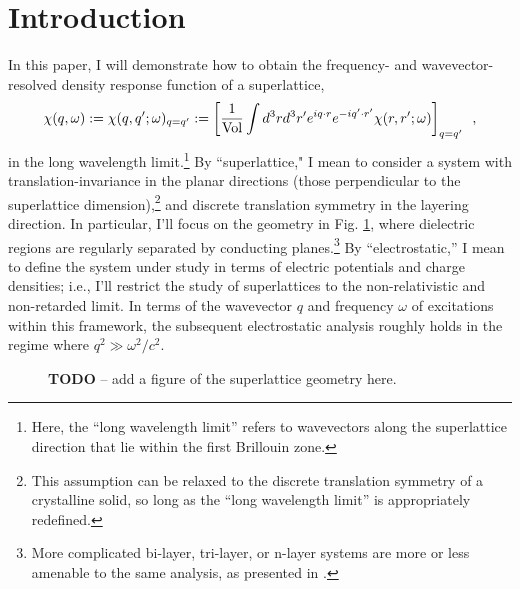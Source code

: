 \section*{Introduction}

In this paper, I will demonstrate how to obtain the frequency- and wavevector-resolved density response function of a superlattice,
\begin{equation}
    \label{Fourier chi}
    \chi(q,\omega):=\chi(q,q';\omega)_{q=q'}
    :=
    \left[\frac{1}{\text{Vol}}\int d^3 r d^3 r' e^{iq\cdot r} e^{-i q'\cdot r'}\chi(r,r';\omega)\right]_{q=q'}
    \,\,\,,
\end{equation}
in the long wavelength limit.\footnote{Here, the ``long wavelength limit'' refers to wavevectors along the superlattice direction that lie within the first Brillouin zone.}  By ``superlattice," I mean to consider a system with translation-invariance in the planar directions (those perpendicular to the superlattice dimension),\footnote{This assumption can be relaxed to the discrete translation symmetry of a crystalline solid, so long as the ``long wavelength limit'' is appropriately redefined.} and discrete translation symmetry in the layering direction.  In particular, I'll focus on the geometry in Fig. \ref{figure: superlattice geometry}, where dielectric regions are regularly separated by conducting planes.\footnote{More complicated bi-layer, tri-layer, or n-layer systems are more or less amenable to the same analysis, as presented in \cite{Cottam1993, Cottam2004}.}  By ``electrostatic,'' I mean to define the system under study in terms of electric potentials and charge densities; i.e., I'll restrict the study of superlattices to the non-relativistic and non-retarded limit.  In terms of the wavevector $q$ and frequency $\omega$ of excitations within this framework, the subsequent electrostatic analysis roughly holds in the regime where $q^2\gg \omega^2/c^2$.

\begin{figure}
    \centering
    \caption{
    {\bf TODO} -- add a figure of the superlattice geometry here.
    }
    \label{figure: superlattice geometry}
\end{figure}
